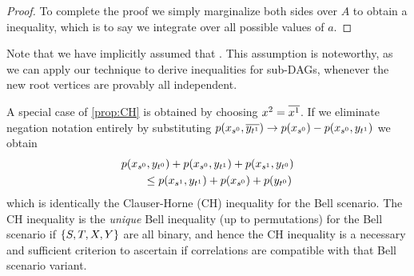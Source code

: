 \begin{proof}
To complete the proof we simply marginalize both sides over $A$ to obtain a  inequality, which is to say we integrate over all possible values of $a$.\end{proof}

Note that we have implicitly assumed that . This assumption is noteworthy, as we can apply our technique to derive inequalities for sub-DAGs, whenever the new root vertices are provably all independent. 

A special case of \cref{prop:CH} is obtained by choosing $x^2=\overline{x^1}$. If we eliminate negation notation entirely by substituting $p\lparen x_{s^0} , \overline{y_{t^1}}\rparen \to p\lparen x_{s^0}\rparen-p\lparen x_{s^0} , y_{t^1}\rparen$ we obtain
\begin{align}\begin{split}
&p\lparen x_{s^0} , y_{t^0}\rparen +p\lparen x_{s^0} , y_{t^1}\rparen + p\lparen x_{s^1} , y_{t^0}\rparen \\&\qquad\leq p\lparen x_{s^1} , y_{t^1}\rparen +p\lparen x_{s^0}\rparen + p\lparen y_{t^0}\rparen
\end{split}\end{align}
which is identically the Clauser-Horne (CH) inequality \cite{CHInequality} for the Bell scenario. The CH inequality is the \emph{unique} Bell inequality (up to permutations) for the Bell scenario if $\left\lbrace S,T,X,Y\right\rbrace$ are all binary, and hence the CH inequality is a necessary and sufficient criterion to ascertain if correlations are compatible with that Bell scenario variant.


